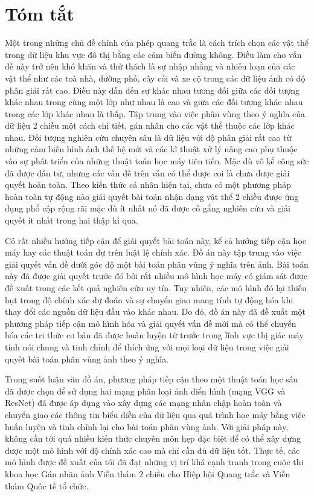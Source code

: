 \chapter*{Tóm tắt}
Một trong những chủ đề chính của phép quang trắc là cách trích chọn các vật
thể trong dữ liệu khu vực đô thị bằng các cảm biến đường không. Điều làm cho
vấn đề này trở nên khó khăn và thử thách là sự nhập nhằng và nhiễu loạn của
các vật thể như các toà nhà, đường phố, cây cối và xe cộ trong các dữ liệu ảnh
có độ phân giải rất cao. Điều này dẫn đến sự khác nhau tương đối giữa các đối
tượng khác nhau trong cùng một lớp như nhau là cao và giữa các đối tượng khác
nhau trong các lớp khác nhau là thấp. Tập trung vào việc phân vùng theo ý nghĩa
của dữ liệu 2 chiều một cách chi tiết, gán nhãn cho các vật thể thuộc các lớp
khác nhau. Đối tượng nghiên cứu chuyên sâu là dữ liệu với độ phân giải rất cao
từ những cảm biến hình ảnh thế hệ mới và các kĩ thuật xử lý nâng cao phụ thuộc
vào sự phát triển của những thuật toán học máy tiên tiến. Mặc dù vô kể công sức
đã được đầu tư, nhưng các vấn đề trên vẫn có thể được coi là chưa được giải
quyết hoàn toàn. Theo kiến thức cá nhân hiện tại, chưa có một phương pháp hoàn
toàn tự động nào giải quyết bài toán nhận dạng vật thể 2 chiều được ứng dụng
phổ cập rộng rãi mặc dù ít nhất nó đã được cố gắng nghiên cứu và giải quyết ít
nhất trong hai thập kỉ qua.


Có rất nhiều hướng tiếp cận để giải quyết bài toán này, kể cả hướng tiếp cận
học máy hay các thuật toán dự trên luật lệ chính xác. Đồ án này tập trung vào
việc giải quyết vấn đề dưới góc độ một bài toán phân vùng ý nghĩa trên ảnh.
Bài toán này đã được giải quyết trước đó bởi rất nhiều mô hình học máy có giám
sát được đề xuất trong các kết quả nghiên cứu uy tín. Tuy nhiên, các mô hình
đó lại thiếu hụt trong độ chính xác dự đoán và sự chuyển giao mang tính tự động
hóa khi thay đổi các nguồn dữ liệu đầu vào khác nhau. Do đó, đồ án này đã đề
xuất một phương pháp tiếp cận mô hình hóa và giải quyết vấn đề mới mà có thể
chuyển hóa các tri thức cơ bản đã được huấn luyện từ trước trong lĩnh vực thị
giác máy tính nói chung và tinh chỉnh để thích ứng với mọi loại dữ liệu trong
việc giải quyết bài toán phân vùng ảnh theo ý nghĩa.


Trong suốt luận văn đồ án, phương pháp tiếp cận theo một thuật toán học sâu đã
được chọn để sử dụng hai mạng phân loại ảnh điển hình (mạng VGG và ResNet) đã
được áp dụng vào xây dựng các mạng nhân chập hoàn toàn và chuyển giao các thông
tin biểu diễn của dữ liệu qua quá trình học máy bằng việc huấn luyện và tinh
chỉnh lại cho bài toán phân vùng ảnh. Với giải pháp này, không cần tới quá
nhiều kiến thức chuyên môn hẹp đặc biệt để có thể xây dựng được một mô hình với
độ chính xác cao mà chỉ cần đủ dữ liệu tốt. Thực tế, các mô hình được đề xuất
của tôi đã đạt những vị trí khá cạnh tranh trong cuộc thi khoa học Gán nhãn ảnh
Viễn thám 2 chiều cho Hiệp hội Quang trắc và Viễn thám Quốc tế tổ chức.
